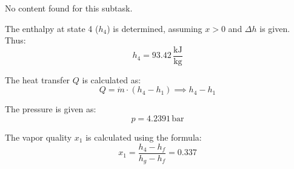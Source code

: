 No content found for this subtask.

The enthalpy at state 4 (\( h_4 \)) is determined, assuming \( x > 0 \) and \( \Delta h \) is given. Thus:  
\[
h_4 = 93.42 \, \frac{\text{kJ}}{\text{kg}}
\]  

The heat transfer \( Q \) is calculated as:  
\[
Q = \dot{m} \cdot (h_4 - h_1) \implies h_4 - h_1
\]  

The pressure is given as:  
\[
p = 4.2391 \, \text{bar}
\]  

The vapor quality \( x_1 \) is calculated using the formula:  
\[
x_1 = \frac{h_4 - h_f}{h_g - h_f} = 0.337
\]